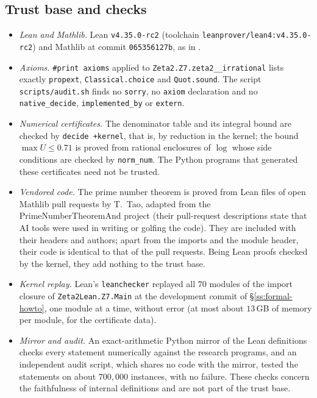 \documentclass{amsart}
\theoremstyle{definition}
\theoremstyle{remark}
\numberwithin{equation}{section}
\begin{document}
\subsection{Trust base and checks}\label{ss:formal-trust}

\begin{itemize}
\item \emph{Lean and Mathlib.} Lean \texttt{v4.35.0-rc2} (toolchain
  \texttt{leanprover/\allowbreak lean4:\allowbreak v4.35.0-rc2}) and Mathlib
  at commit \texttt{065356127b}, as in \cite{DevPair26}.
\item \emph{Axioms.} \texttt{\#print axioms} applied to \texttt{Zeta2.Z7.zeta2\_\_\allowbreak irrational}
  lists exactly \texttt{propext}, \texttt{Classical.choice} and
  \texttt{Quot.sound}. The script \texttt{scripts/audit.sh} finds no
  \texttt{sorry}, no \texttt{axiom} declaration and no
  \texttt{native\_decide}, \texttt{implemented\_by} or \texttt{extern}.
\item \emph{Numerical certificates.} The denominator table and its integral
  bound are checked by \texttt{decide +kernel}, that is, by reduction in the
  kernel; the bound $\max U\le0.71$ is proved from rational enclosures of
  $\log$ whose side conditions are checked by \texttt{norm\_num}. The Python
  programs that generated these certificates need not be trusted.
\item \emph{Vendored code.} The prime number theorem is proved from Lean
  files of open Mathlib pull requests by T.~Tao, adapted from the
  PrimeNumberTheoremAnd project \cite{PNTLean} (their pull-request
  descriptions state that AI tools were used in writing or golfing the
  code). They are included with their headers and authors; apart from the
  imports and the module header, their code is identical to that of the pull
  requests. Being Lean proofs checked by the kernel, they add nothing to the
  trust base.
\item \emph{Kernel replay.} Lean's \texttt{leanchecker} replayed all $70$
  modules of the import closure of \texttt{Zeta2Lean.Z7.Main} at the
  development commit of \S\ref{ss:formal-howto}, one module at a
  time, without error (at most about $13$\,GB of memory per module, for the
  certificate data).
\item \emph{Mirror and audit.} An exact-arithmetic Python mirror of the Lean
  definitions checks every statement numerically against the research
  programs, and an independent audit script, which shares no code with the
  mirror, tested the statements on about $700{,}000$ instances, with no
  failure. These checks concern the faithfulness of internal definitions and
  are not part of the trust base.
\end{itemize}
\end{document}
